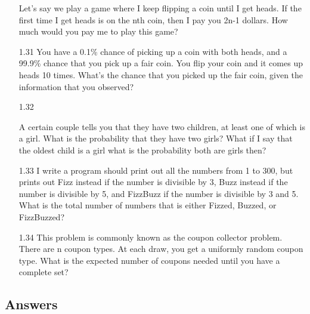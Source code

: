 \begin{enumerate}
Let’s say we play a game where I keep flipping a coin until I get heads. If the first time I get heads is on the nth coin, then I pay you 2n-1 dollars. How much would you pay me to play this game?

\item[1.31]
You have a 0.1\% chance of picking up a coin with both heads, and a 99.9\% chance that you pick up a fair coin. You flip your coin and it comes up heads 10 times. What’s the chance that you picked up the fair coin, given the information that you observed?

\item[1.32]

A certain couple tells you that they have two children, at least one of which is a girl. What is the probability that they have two girls? What if I say that the oldest child is a girl what is the probability both are girls then?

\item[1.33]
I write a program should print out all the numbers from 1 to 300, but prints out Fizz instead if the number is divisible by 3, Buzz instead if the number is divisible by 5, and FizzBuzz if the number is divisible by 3 and 5. What is the total number of numbers that is either Fizzed, Buzzed, or FizzBuzzed?

\item[1.34]
This problem is commonly known as the coupon collector problem. There are n coupon types. At each draw, you get a uniformly random coupon type. What is the expected number of coupons needed until you have a complete set?


\end{enumerate}

\subsection{Answers}

